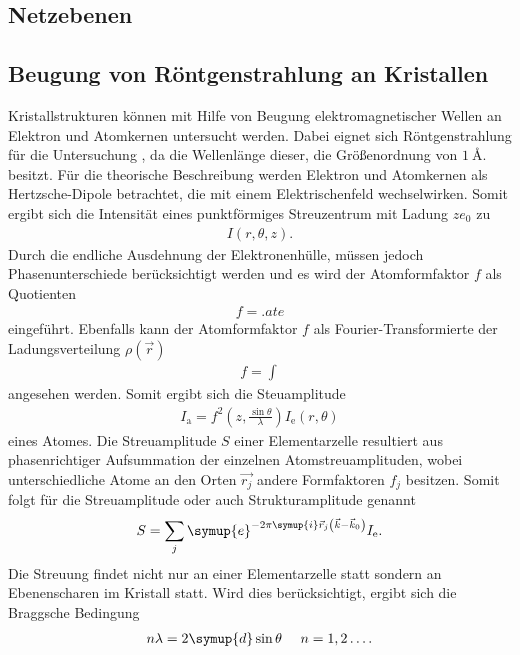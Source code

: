 \subsection{Netzebenen}
\label{subsec:netzebenen}

\subsection{Beugung von Röntgenstrahlung an Kristallen}
\label{subsec:Beugung}
Kristallstrukturen können mit Hilfe von Beugung
elektromagnetischer Wellen an Elektron und Atomkernen untersucht werden.
Dabei eignet sich Röntgenstrahlung für die Untersuchung
, da die Wellenlänge dieser, die Größenordnung
von $\SI{1}{\angstrom}$.
 besitzt.
Für die theorische Beschreibung werden Elektron und Atomkernen
als Hertzsche-Dipole betrachtet, die mit einem
Elektrischenfeld wechselwirken.
Somit ergibt sich die Intensität eines punktförmiges Streuzentrum mit
Ladung $ze_0$ zu
\begin{align}
  I(r,\theta,z)  \label{6}.
\end{align}
Durch die endliche Ausdehnung der Elektronenhülle,
müssen jedoch Phasenunterschiede
berücksichtigt werden und es wird
der Atomformfaktor $f$ als Quotienten
\begin{align}
f=.ate
\end{align}
eingeführt.
Ebenfalls kann der Atomformfaktor $f$ als Fourier-Transformierte
der Ladungsverteilung $\rho(\vec{r})$
\begin{align}
f=\int
\end{align}
angesehen werden.
Somit ergibt sich die Steuamplitude
\begin{align}
  I_\mathrm{a}=f^2\left(z,\frac{\sin\theta}{\lambda}\right)I_\mathrm{e}\left(r,\theta\right)
\end{align}
eines Atomes.
Die Streuamplitude $S$ einer Elementarzelle resultiert aus
phasenrichtiger Aufsummation der
einzelnen Atomstreuamplituden, wobei unterschiedliche
Atome an den Orten $\vec{r_j}$
andere Formfaktoren $f_j$ besitzen.
Somit folgt für die Streuamplitude oder auch Strukturamplitude genannt
\begin{align}
  S=\sum_j \symup{e}^{-2\pi \symup{i} \vec{r}_j\left(\vec{k}-\vec{k}_0\right)} I_\mathrm{e}.
\end{align}
Die Streuung findet nicht nur an einer Elementarzelle statt sondern an Ebenenscharen im Kristall statt.
Wird dies berücksichtigt, ergibt sich die
Braggsche Bedingung
\begin{align}
n\lambda= 2\symup{d}\sin{\theta} \ \ \ \ n=1,2\dots \label{eqn:10} .
\end{align}
